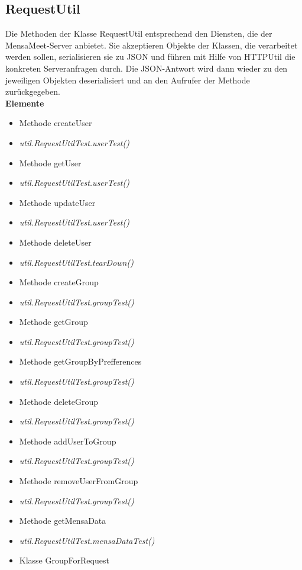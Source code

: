 \documentclass[a4paper]{scrreprt}
\begin{document}
\subsection{RequestUtil}
Die Methoden der Klasse RequestUtil entsprechend den Diensten, die der MensaMeet-Server anbietet. Sie akzeptieren Objekte der Klassen, die verarbeitet werden sollen, serialisieren sie zu JSON und führen mit Hilfe von HTTPUtil die konkreten Serveranfragen durch. Die JSON-Antwort wird dann wieder zu den jeweiligen Objekten deserialisiert und an den Aufrufer der Methode zurückgegeben. \\

\textbf{Elemente} \\

\begin{itemize}
\item Methode createUser
\item \textit{util.RequestUtilTest.userTest()}
\item Methode getUser
\item \textit{util.RequestUtilTest.userTest()}
\item Methode updateUser
\item \textit{util.RequestUtilTest.userTest()}
\item Methode deleteUser
\item \textit{util.RequestUtilTest.tearDown()}
\item Methode createGroup
\item \textit{util.RequestUtilTest.groupTest()}
\item Methode getGroup
\item \textit{util.RequestUtilTest.groupTest()}
\item Methode getGroupByPrefferences
\item \textit{util.RequestUtilTest.groupTest()}
\item Methode deleteGroup
\item \textit{util.RequestUtilTest.groupTest()}
\item Methode addUserToGroup
\item \textit{util.RequestUtilTest.groupTest()}
\item Methode removeUserFromGroup
\item \textit{util.RequestUtilTest.groupTest()}
\item Methode getMensaData
\item \textit{util.RequestUtilTest.mensaDataTest()}
\item Klasse GroupForRequest \\

\end{itemize}
\end{document}
